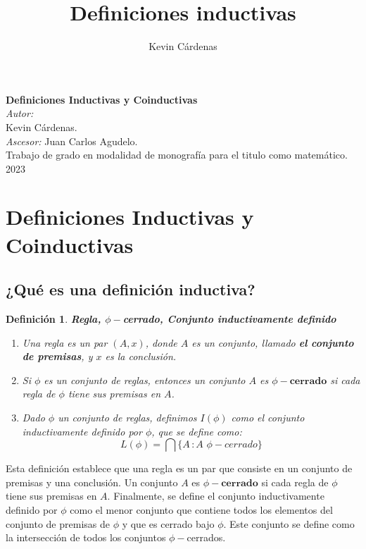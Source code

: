 \documentclass[executivepaper]{article}
\title{Definiciones inductivas}
\author{Kevin Cárdenas}
\newtheorem{defi}[propo]{Definición}
\begin{document}
\begin{titlepage}
    \begin{center}
        {\Huge \textbf{Definiciones Inductivas y Coinductivas}}
        \\[9cm]
        
        \large\emph{Autor:}\\
        Kevin Cárdenas.
        \\[9cm]
        \large\emph{Ascesor:}
        Juan Carlos Agudelo.\\
        Trabajo de grado en modalidad de monografía para el titulo como matemático.\\
        2023
    \end{center}
\end{titlepage}

\newpage
\tableofcontents
\newpage
\section{Definiciones Inductivas y Coinductivas}
\subsection{¿Qué es una definición inductiva?}
\begin{defi}
\textbf{Regla, $\phi-$cerrado, Conjunto inductivamente definido}
\begin{enumerate}
\item Una regla es un par $(A,x)$, donde $A$ es un conjunto, llamado \textbf{el conjunto de premisas}, y $x$ es la conclusión.
\item Si $\phi$ es un conjunto de reglas, entonces un conjunto $A$ es $\phi - \textbf{cerrado}$ si cada regla de $\phi$ tiene sus premisas en $A$.
\item Dado $\phi$ un conjunto de reglas, definimos $I(\phi)$ como el conjunto inductivamente definido por $\phi$, que se define como:
$$L(\phi) = \bigcap\{A \, : A\,\, \phi-cerrado\}$$
\end{enumerate}
\end{defi}
Esta definición establece que una regla es un par que consiste en un conjunto de premisas y una conclusión. Un conjunto $A$ es $\phi - \textbf{cerrado}$ si cada regla de $\phi$ tiene sus premisas en $A$. Finalmente, se define el conjunto inductivamente definido por $\phi$ como el menor conjunto que contiene todos los elementos del conjunto de premisas de $\phi$ y que es cerrado bajo $\phi$. Este conjunto se define como la intersección de todos los conjuntos $\phi-$cerrados.
\end{document}
